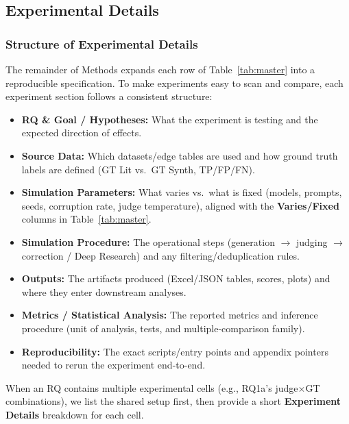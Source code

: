 \subsection{Experimental Details}
\label{sec:experimental_details}

\subsubsection{Structure of Experimental Details}
\label{sec:experiment_details_structure}

The remainder of Methods expands each row of Table~\ref{tab:master} into a reproducible specification. To make experiments easy to scan and compare, each experiment section follows a consistent structure:
\begin{itemize}[noitemsep]
    \item \textbf{RQ \& Goal / Hypotheses:} What the experiment is testing and the expected direction of effects.
    \item \textbf{Source Data:} Which datasets/edge tables are used and how ground truth labels are defined (GT Lit vs.\ GT Synth, TP/FP/FN).
    \item \textbf{Simulation Parameters:} What varies vs.\ what is fixed (models, prompts, seeds, corruption rate, judge temperature), aligned with the \textbf{Varies/Fixed} columns in Table~\ref{tab:master}.
    \item \textbf{Simulation Procedure:} The operational steps (generation $\rightarrow$ judging $\rightarrow$ correction / Deep Research) and any filtering/deduplication rules.
    \item \textbf{Outputs:} The artifacts produced (Excel/JSON tables, scores, plots) and where they enter downstream analyses.
    \item \textbf{Metrics / Statistical Analysis:} The reported metrics and inference procedure (unit of analysis, tests, and multiple-comparison family).
    \item \textbf{Reproducibility:} The exact scripts/entry points and appendix pointers needed to rerun the experiment end-to-end.
\end{itemize}

When an RQ contains multiple experimental cells (e.g., RQ1a’s judge$\times$GT combinations), we list the shared setup first, then provide a short \textbf{Experiment Details} breakdown for each cell.

